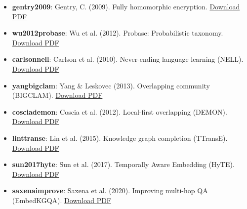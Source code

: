 \begin{itemize}
\item \textbf{gentry2009}: Gentry, C. (2009). Fully homomorphic encryption. \href{https://crypto.stanford.edu/craig/craig-thesis.pdf}{Download PDF}
\item \textbf{wu2012probase}: Wu et al. (2012). Probase: Probab\-ilistic taxonomy. \href{https://www.cs.uwyo.edu/~ruben/cs5011/probase.pdf}{Download PDF}
\item \textbf{carlson\-nell}: Carlson et al. (2010). Never-ending language learning (NELL). \href{http://www.cs.cmu.edu/~acarlson/papers/carlson-aaai10.pdf}{Download PDF}
\item \textbf{yang\-bigclam}: Yang \& Leskovec (2013). Overlapping community (BIGCLAM). \href{https://arxiv.org/pdf/1205.6228.pdf}{Download PDF}
\item \textbf{coscia\-demon}: Coscia et al. (2012). Local-first overlapping (DEMON). \href{https://arxiv.org/pdf/1206.0629.pdf}{Download PDF}
\item \textbf{lin\-ttranse}: Lin et al. (2015). Knowledge graph completion (TTransE). \href{https://thunlp.org/~lzy/publications/aaai2015_transr.pdf}{Download PDF}
\item \textbf{sun2017hyte}: Sun et al. (2017). Temporally Aware Embedding (HyTE). \href{https://www.researchgate.net/profile/Shibiao_Sun/publication/320448102_Hyte_Joint_embedding_of_entities_relations_and_time/links/5a9e59d9a6fdcc546ad881f3/Hyte-Joint-embedding-of-entities-relations-and-time.pdf}{Download PDF}
\item \textbf{saxena\-improve}: Saxena et al. (2020). Improving multi-hop QA (EmbedKGQA). \href{https://arxiv.org/pdf/1909.11855.pdf}{Download PDF}

\end{itemize}